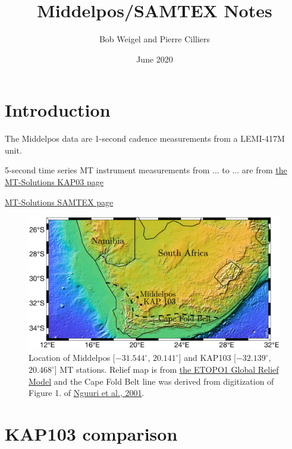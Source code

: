 \documentclass{article}
\title{Middelpos/SAMTEX Notes}
\author{Bob Weigel and Pierre Cilliers}
\date{June 2020}
\begin{document}

\section{Introduction}

The Middelpos data are 1-second cadence measurements from a LEMI-417M unit.

5-second time series MT instrument measurements from ... to ... are from \href{https://www.mtnet.info/data/kap03/kap03.html}{the MT-Solutions KAP03 page}


\href{https://www.mtnet.info/data/samtex/samtex.html}{MT-Solutions SAMTEX page}

\begin{figure}[h!]
\centering
\includegraphics[width=\textwidth]{figures/map.pdf}
\caption{Location of Middelpos [$-31.544^\circ$, $20.141^\circ$] and KAP103 [$-32.139^\circ$, $20.468^\circ$] MT stations. Relief map is from \href{ngdc.noaa.gov/mgg/global/global.html}{the ETOPO1 Global Relief Model} and the Cape Fold Belt line was derived from digitization of Figure 1. of \href{https://agupubs.onlinelibrary.wiley.com/doi/pdf/10.1029/2000GL012587}{Nguuri et al., 2001}.}
\label{fig:map}
\end{figure}

\clearpage

\section{KAP103 comparison}
\end{document}
